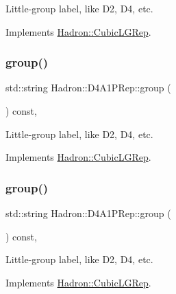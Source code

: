 Little-\/group label, like D2, D4, etc. 

Implements \mbox{\hyperlink{structHadron_1_1CubicLGRep_a9bdb14b519a611d21379ed96a3a9eb41}{Hadron\+::\+Cubic\+L\+G\+Rep}}.

\mbox{\label{structHadron_1_1D4A1PRep_aa8107b90fadc4874becba2ef3366e1b7}} 
\subsubsection{\texorpdfstring{group()}{group()}\hspace{0.1cm}{\footnotesize\ttfamily [2/3]}}
{\footnotesize\ttfamily std\+::string Hadron\+::\+D4\+A1\+P\+Rep\+::group (\begin{DoxyParamCaption}{ }\end{DoxyParamCaption}) const\hspace{0.3cm}{\ttfamily [inline]}, {\ttfamily [virtual]}}

Little-\/group label, like D2, D4, etc. 

Implements \mbox{\hyperlink{structHadron_1_1CubicLGRep_a9bdb14b519a611d21379ed96a3a9eb41}{Hadron\+::\+Cubic\+L\+G\+Rep}}.

\mbox{\label{structHadron_1_1D4A1PRep_aa8107b90fadc4874becba2ef3366e1b7}} 
\subsubsection{\texorpdfstring{group()}{group()}\hspace{0.1cm}{\footnotesize\ttfamily [3/3]}}
{\footnotesize\ttfamily std\+::string Hadron\+::\+D4\+A1\+P\+Rep\+::group (\begin{DoxyParamCaption}{ }\end{DoxyParamCaption}) const\hspace{0.3cm}{\ttfamily [inline]}, {\ttfamily [virtual]}}

Little-\/group label, like D2, D4, etc. 

Implements \mbox{\hyperlink{structHadron_1_1CubicLGRep_a9bdb14b519a611d21379ed96a3a9eb41}{Hadron\+::\+Cubic\+L\+G\+Rep}}.

\mbox{\label{structHadron_1_1D4A1PRep_ab4f311aa3268628a8380e1e73c6023a1}} 
